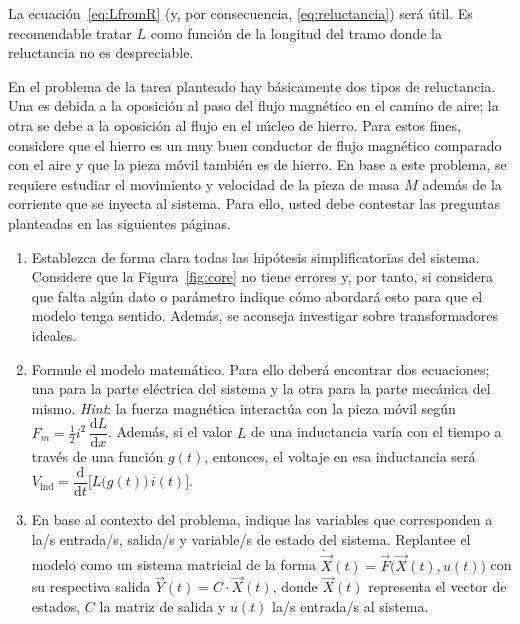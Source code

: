 \documentclass[
  11pt,
  letterpaper,
   addpoints,
   answers
  ]{exam}
\begin{document}
\begin{questions}
\medskip
La ecuación~\eqref{eq:LfromR} (y, por consecuencia, \eqref{eq:reluctancia}) será útil. Es recomendable tratar $L$ como función de la longitud del tramo donde la reluctancia no es despreciable.

En el problema de la tarea planteado hay básicamente dos tipos de reluctancia. Una es debida a la oposición al paso del flujo magnético en el camino de aire; la otra se debe a la oposición al flujo en el núcleo de hierro. Para estos fines, considere que el hierro es un muy buen conductor de flujo magnético comparado con el aire y que la pieza móvil también es de hierro. En base a este problema, se requiere estudiar el movimiento y velocidad de la pieza de masa $M$ además de la corriente que se inyecta al sistema. Para ello, usted debe contestar las preguntas planteadas en las siguientes páginas.

\vspace{0.5cm}
\noindent{}

\begin{enumerate}
  \item Establezca de forma clara todas las hipótesis simplificatorias del sistema. Considere que la Figura~\ref{fig:core} no tiene errores y, por tanto, si considera que falta algún dato o parámetro indique cómo abordará esto para que el modelo tenga sentido. Además, se aconseja investigar sobre transformadores ideales.

  \item Formule el modelo matemático. Para ello deberá encontrar dos ecuaciones; una para la parte eléctrica del sistema y la otra para la parte mecánica del mismo. \emph{Hint}: la fuerza magnética interactúa con la pieza móvil según $F_m = \tfrac{1}{2} i^2\, \dfrac{\mathrm{d}L}{\mathrm{d}x}$. Además, si el valor $L$ de una inductancia varía con el tiempo a través de una función $g(t)$, entonces, el voltaje en esa inductancia será $V_{\text{ind}} = \dfrac{\mathrm{d}}{\mathrm{d}t}\big[L\big(g(t)\big)\, i(t)\big]$.

  \item En base al contexto del problema, indique las variables que corresponden a la/s entrada/s, salida/s y variable/s de estado del sistema. Replantee el modelo como un sistema matricial de la forma $\dot{\vec{X}}(t) = \vec{F}\big(\vec{X}(t), u(t)\big)$ con su respectiva salida $\vec{Y}(t) = C \cdot \vec{X}(t)$, donde $\vec{X}(t)$ representa el vector de estados, $C$ la matriz de salida y $u(t)$ la/s entrada/s al sistema.


\end{enumerate}
\end{questions}
\end{document}

